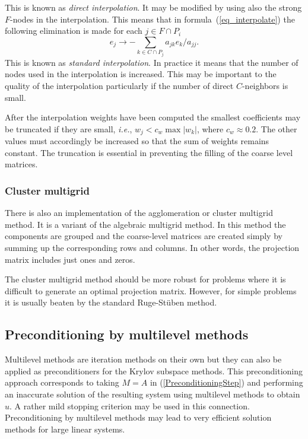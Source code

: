 \begin{versiona}
This is known as {\em direct interpolation}. It may be modified by using also 
the strong $F$-nodes in the interpolation. This means that 
in formula~(\ref{eq_interpolate}) the following 
elimination is made for each $j \in F \cap P_i$
\begin{equation}
  e_j \rightarrow - \sum_{k \in C \cap P_j} a_{jk}e_k/a_{jj} .
\end{equation}
This is known as {\em standard interpolation}.
In practice it means that the number of nodes used in the interpolation
is increased. This may be important to the quality of the interpolation 
particularly if the number of direct $C$-neighbors is small.

After the interpolation weights have been computed the smallest 
coefficients may be truncated if they are small, {\em i.e.},
$w_j < c_w \max | w_k | $, where $c_w \approx 0.2$.
The other values must accordingly be increased so that the sum of weights
remains constant.
The truncation is essential in preventing the 
filling of the coarse level matrices.

\subsubsection*{Cluster multigrid}
There is also an implementation of the agglomeration or cluster multigrid method. 
It is a variant of the algebraic multigrid method. In this method the components are
grouped and the coarse-level matrices are created simply by summing up the corresponding 
rows and columns. In other words, the projection matrix includes just ones and zeros. 

The cluster multigrid method should be more robust for problems where it is difficult to
generate an optimal projection matrix. However, for simple problems it is usually beaten 
by the standard Ruge-St{\"u}ben method.



\subsubsection*{}

\subsection{Preconditioning by multilevel methods}\label{MultilevelPreconditioning}

Multilevel methods are iteration methods on their own but they can also be
applied as preconditioners for the Krylov subspace methods. 
This preconditioning approach corresponds to taking $M=A$ in (\ref{PreconditioningStep}) 
and performing an inaccurate solution of the resulting system using multilevel methods
to obtain $u$. A rather mild stopping criterion may be used in this connection. 
Preconditioning by multilevel methods may lead to very efficient solution methods for
large linear systems. 


\end{versiona}

